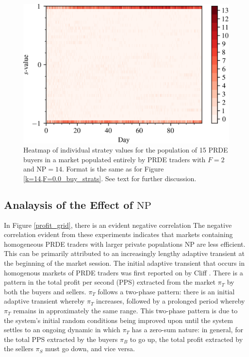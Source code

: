 \documentclass[conference]{IEEEtran}
\begin{document}
\begin{figure}[htbp]
    \centerline{\includegraphics[width=\columnwidth]{k=14,F=2.0_buy_strats.png}}
    \caption{
        Heatmap of individual stratey values for the population of 15 PRDE buyers in a market populated entirely by PRDE traders with $F=2$ and $\mathrm{NP}=14$.
        Format is the same as for Figure \ref{k=14,F=0.0_buy_strats}.
        See text for further discussion.
    }
    \label{k=14,F=2.0_buy_strats}
\end{figure}

\subsection{Analaysis of the Effect of $\mathrm{NP}$}

In Figure \ref{profit_grid}, there is an evident negative correlation 
The negative correlation evident from these experiments indicates that markets containing homogeneous PRDE traders with larger private populations $\mathrm{NP}$ are less efficient.
This can be primarily attributed to an increasingly lengthy adaptive transient at the beginning of the market session.
The initial adaptive transient that occurs in homogenous markets of PRDE traders was first reported on by Cliff \cite{PRDE}.
There is a pattern in the total profit per second (PPS) extracted from the market $\pi_T$ by both the buyers and sellers.
$\pi_T$ follows a two-phase pattern: there is an initial adaptive transient whereby $\pi_T$ increases, followed by a prolonged period whereby $\pi_T$ remains in approximately the same range.
This two-phase pattern is due to the system's initial random conditions being improved upon until the system settles to an ongoing dynamic in which $\pi_T$ has a zero-sum nature: in general, for the total PPS extracted by the buyers $\pi_B$ to go up, the total profit extracted by the sellers $\pi_S$ must go down, and vice versa.
\end{document}
